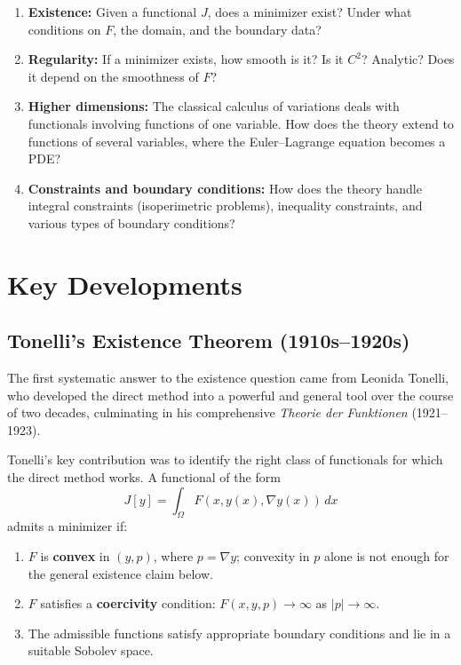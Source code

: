 \begin{enumerate}
    \item \textbf{Existence:} Given a functional $J$, does a minimizer exist? Under what conditions on $F$, the domain, and the boundary data?
    \item \textbf{Regularity:} If a minimizer exists, how smooth is it? Is it $C^2$? Analytic? Does it depend on the smoothness of $F$?
    \item \textbf{Higher dimensions:} The classical calculus of variations deals with functionals involving functions of one variable. How does the theory extend to functions of several variables, where the Euler--Lagrange equation becomes a PDE?
    \item \textbf{Constraints and boundary conditions:} How does the theory handle integral constraints (isoperimetric problems), inequality constraints, and various types of boundary conditions?
\end{enumerate}

\section{Key Developments}

\subsection{Tonelli's Existence Theorem (1910s--1920s)}

The first systematic answer to the existence question came from Leonida Tonelli, who developed the direct method into a powerful and general tool over the course of two decades, culminating in his comprehensive \emph{Theorie der Funktionen} (1921--1923).

Tonelli's key contribution was to identify the right class of functionals for which the direct method works. A functional of the form
\[
    J[y] = \int_\Omega F(x, y(x), \nabla y(x)) \, dx
\]
admits a minimizer if:
\begin{enumerate}
    \item $F$ is \textbf{convex} in $(y,p)$, where $p = \nabla y$; convexity in $p$ alone is not enough for the general existence claim below.
    \item $F$ satisfies a \textbf{coercivity} condition: $F(x, y, p) \to \infty$ as $|p| \to \infty$.
    \item The admissible functions satisfy appropriate boundary conditions and lie in a suitable Sobolev space.
\end{enumerate}

